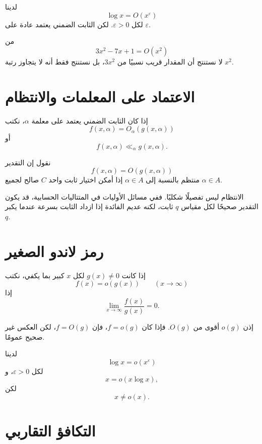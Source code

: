 \begin{example}
لدينا
\[
\log x=O(x^\varepsilon)
\]
لكل \(\varepsilon>0\). لكن الثابت الضمني يعتمد عادة على \(\varepsilon\).
\end{example}

\begin{example}
من
\[
3x^2-7x+1=O(x^2)
\]
لا نستنتج أن المقدار قريب نسبيًا من \(3x^2\)، بل نستنتج فقط أنه لا يتجاوز رتبة \(x^2\).
\end{example}

\section{الاعتماد على المعلمات والانتظام}

إذا كان الثابت الضمني يعتمد على معلمة \(\alpha\)، نكتب
\[
f(x,\alpha)=O_\alpha(g(x,\alpha))
\]
أو
\[
f(x,\alpha)\ll_\alpha g(x,\alpha).
\]

\begin{definition}
نقول إن التقدير
\[
f(x,\alpha)=O(g(x,\alpha))
\]
منتظم بالنسبة إلى \(\alpha\in A\) إذا أمكن اختيار ثابت واحد \(C\) صالح لجميع \(\alpha\in A\).
\end{definition}

الانتظام ليس تفصيلًا شكليًا. ففي مسائل الأوليات في المتتاليات الحسابية، قد يكون التقدير صحيحًا لكل مقياس \(q\) ثابت، لكنه عديم الفائدة إذا ازداد الثابت بسرعة عندما يكبر \(q\).

\section{رمز لاندو الصغير}

\begin{definition}
إذا كانت \(g(x)\neq0\) لكل \(x\) كبير بما يكفي، نكتب
\[
f(x)=o(g(x))
\qquad (x\to\infty)
\]
إذا
\[
\lim_{x\to\infty}\frac{f(x)}{g(x)}=0.
\]
\end{definition}

إذن \(o(g)\) أقوى من \(O(g)\). فإذا كان \(f=o(g)\)، فإن \(f=O(g)\)، لكن العكس غير صحيح عمومًا.

\begin{example}
لدينا
\[
\log x=o(x^\varepsilon)
\]
لكل \(\varepsilon>0\)، و
\[
x=o(x\log x),
\]
لكن
\[
x\neq o(x).
\]
\end{example}

\section{التكافؤ التقاربي}

